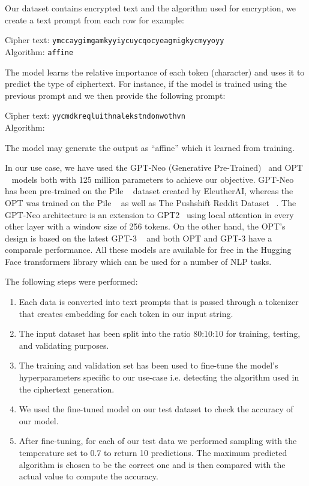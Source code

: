 \documentclass[runningheads]{llncs}
\begin{document}
Our dataset contains encrypted 
text and the algorithm used for encryption, we create a text 
prompt from each row for example: 

\begin{flushleft}
    Cipher text: \texttt{ymccaygimgamkyyiycuycqocyeagmigkycmyyoyy}\\
    Algorithm: \texttt{affine}
\end{flushleft}  

The model learns the relative importance of each token (character) and uses 
it to predict the type of ciphertext. For instance, if the model is trained using the previous prompt and we then provide the following prompt:

\begin{flushleft}
    Cipher text: \texttt{yycmdkreqluithnalekstndonwothvn}\\
    Algorithm: 
\end{flushleft}  

The model may generate the output as “affine” which it learned 
from training. 

In our use case, we have used the GPT-Neo (Generative Pre-Trained)~\cite{GPTNeo70:online} and OPT ~\cite{OPT:online} models both with 125 million parameters to achieve our objective. GPT-Neo has been pre-trained on the Pile ~\cite{pile} dataset created by EleutherAI, whereas the OPT was trained on the Pile ~\cite{pile} as well as The Pushshift Reddit Dataset ~\cite{pushshift}. The GPT-Neo architecture is an extension to GPT2~\cite{radford2019language} using local attention in every other layer with a window size of 256 tokens. On the other hand, the OPT's design is based on the latest GPT-3 ~\cite{gpt3} and both OPT and GPT-3 have a comparale performance. All these models are available for free in the Hugging Face \cite{HuggingF50:online} transformers library which can be used for a number of NLP tasks.  

The following steps were performed:
\begin{enumerate}
    \item   Each data is converted into text prompts 
            that is passed through a tokenizer that creates embedding 
            for each token in our input string. 
    \item   The input dataset has been split into the ratio 
            80:10:10 for training, testing, and validating purposes.
    \item   The training and validation set has been used to 
            fine-tune the model’s hyperparameters specific to 
            our use-case i.e. detecting the algorithm used in 
            the ciphertext generation.
    \item   We used the fine-tuned model on our test dataset 
            to check the accuracy of our model. 
    \item   After fine-tuning, for each of our test data we performed sampling with the temperature set to 0.7 to return 10 predictions. The maximum predicted algorithm is chosen to be the correct one and is then compared with the actual value to compute the accuracy.
\end{enumerate}  
\end{document}
